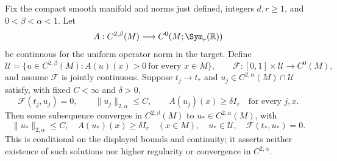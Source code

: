 Fix the compact smooth manifold and norms just defined, integers $d,r\geq1$,
and $0<\beta<\alpha<1$. Let
\[
 A:C^{2,\beta}(M)\longrightarrow C^0(M;\Sym_r(\mathbb R))
\]
be continuous for the uniform operator norm in the target. Define
\[
 \mathcal U=\{u\in C^{2,\beta}(M):A(u)(x)>0\ \text{for every }x\in M\},
 \qquad \mathcal F:[0,1]\times\mathcal U\longrightarrow C^0(M),
\]
and assume $\mathcal F$ is jointly continuous. Suppose $t_j\to t_*$ and
$u_j\in C^{2,\alpha}(M)\cap\mathcal U$ satisfy, with fixed $C<\infty$ and $\delta>0$,
\[
 \mathcal F(t_j,u_j)=0,\qquad \|u_j\|_{2,\alpha}\leq C,\qquad
 A(u_j)(x)\geq\delta I_r\quad\text{for every }j,x.
\]
Then some subsequence converges in $C^{2,\beta}(M)$ to $u_*\in C^{2,\alpha}(M)$, with
\[
 \|u_*\|_{2,\alpha}\leq C,\quad A(u_*)(x)\geq\delta I_r\quad(x\in M),
 \quad u_*\in\mathcal U,\quad\mathcal F(t_*,u_*)=0.
\]
This is conditional on the displayed bounds and continuity; it asserts neither
existence of such solutions nor higher regularity or convergence in $C^{2,\alpha}$.